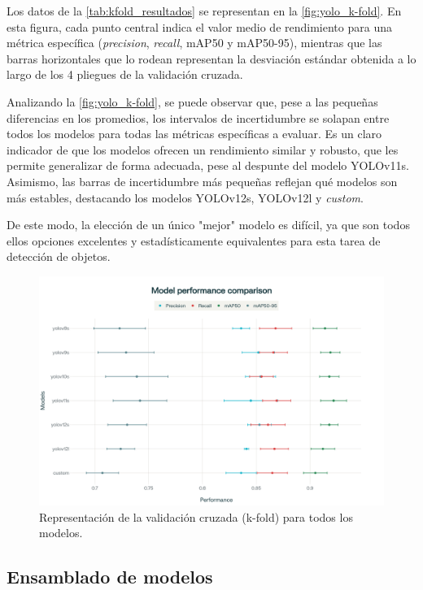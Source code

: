 \documentclass[12pt,a4paper,onecolumn,oneside]{report}
\begin{document}
Los datos de la \autoref{tab:kfold_resultados} se representan en la \autoref{fig:yolo_k-fold}.
En esta figura, cada punto central indica el valor medio de rendimiento para una métrica específica (\textit{precision}, \textit{recall}, mAP50 y mAP50-95), 
mientras que las barras horizontales que lo rodean representan la desviación estándar obtenida a lo largo de los 4 pliegues de la validación cruzada.

Analizando la \autoref{fig:yolo_k-fold}, se puede observar que, pese a las pequeñas diferencias en los promedios, los intervalos de incertidumbre se solapan entre todos los modelos
para todas las métricas específicas a evaluar. Es un claro indicador de que los modelos ofrecen un rendimiento similar y robusto, que les permite generalizar de forma adecuada, pese al despunte del modelo YOLOv11s. 
Asimismo, las barras de incertidumbre más pequeñas reflejan qué modelos son más estables, destacando los modelos YOLOv12s, YOLOv12l y \textit{custom}.

De este modo, la elección de un único "mejor" modelo es difícil, ya que son todos ellos opciones excelentes y estadísticamente equivalentes para esta tarea de detección de objetos. 

\begin{figure}[H]
  \centering
  \includegraphics[width=1.0\textwidth]{figuras/k-fold/Yolo_k-fold.png}
  \caption{Representación de la validación cruzada (k-fold) para todos los modelos.}
  \label{fig:yolo_k-fold}
\end{figure}

\subsection{Ensamblado de modelos}
\label{sec:Ensamblado de modelos}
\end{document}
